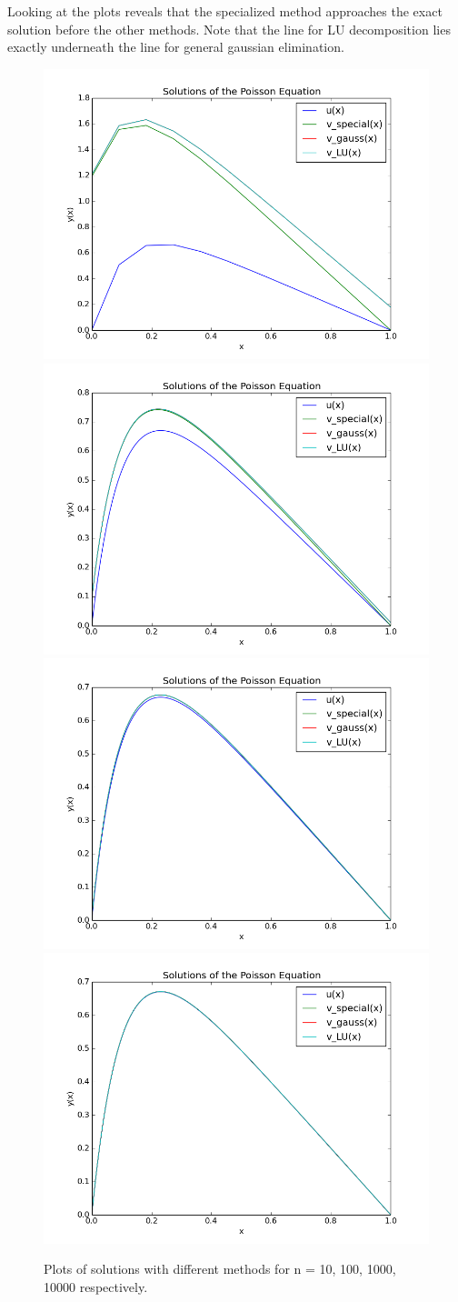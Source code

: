 \documentclass[a4paper,12pt]{article}
\begin{document}
Looking at the plots reveals that the specialized method approaches the exact solution before the other methods.
Note that the line for LU decomposition lies exactly underneath the line for general gaussian elimination.
\begin{center}
\begin{figure}
 \includegraphics[width=.49\textwidth]{figure_n10.png}
 \includegraphics[width=.49\textwidth]{figure_n100.png}
 \includegraphics[width=.49\textwidth]{figure_n1000.png}
 \includegraphics[width=.49\textwidth]{figure_n10000.png}
\caption{Plots of solutions with different methods for n = 10, 100, 1000, 10000 respectively.}
 \end{figure}
\end{center}
\newpage
\end{document}
